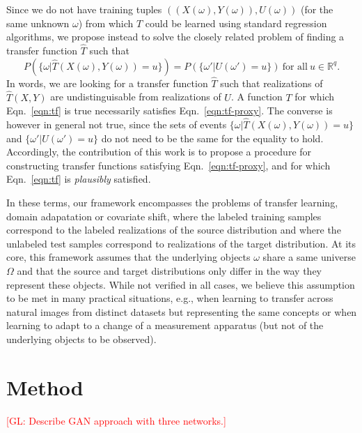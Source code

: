 \documentclass{article}
\newcommand{\glnote}[1]{\textcolor{red}{[GL: #1]}}
\begin{document}
Since we do not have training tuples $((X(\omega), Y(\omega)), U(\omega))$ (for the same
unknown $\omega$) from which $T$ could be learned using standard regression
algorithms, we propose instead to solve the closely related problem of
finding a transfer function $\hat T$ such that
\begin{equation}\label{eqn:tf-proxy}
P(\{ \omega | \hat T(X(\omega), Y(\omega)) = u \}) = P(\{ \omega' | U(\omega') = u \}) ~\text{for all}~ u \in \mathbb{R}^q.
\end{equation}
In words, we are looking for a transfer function $\hat T$ such that realizations
of $\hat T(X,Y)$ are undistinguisable from realizations of $U$. A function $T$ for
which Eqn.~\ref{eqn:tf} is true necessarily satisfies Eqn.~\ref{eqn:tf-proxy}.
The converse is however in general not true, since the sets of events $\{ \omega |
\hat T(X(\omega), Y(\omega)) = u \}$ and $\{ \omega' | U(\omega') = u \}$ do not need to be
the same for the equality to hold. Accordingly, the contribution of this work is
to propose a procedure for constructing transfer functions satisfying
Eqn.~\ref{eqn:tf-proxy}, and for which Eqn.~\ref{eqn:tf} is {\it plausibly}
satisfied.

In these terms, our framework encompasses the problems of transfer learning,
domain adapatation or covariate shift, where the labeled training samples
correspond to the labeled realizations of the source distribution and where the
unlabeled test samples correspond to realizations of the target distribution. At
its core, this framework assumes that the underlying objects $\omega$ share a
same universe $\Omega$ and that the source and target distributions only differ
in the way they represent these objects. While not verified in all cases, we
believe this assumption to be met in many practical situations, e.g., when
learning to transfer across natural images from distinct datasets but
representing the same concepts or when learning to adapt to a change of a
measurement apparatus (but not of the underlying objects to be observed).



\section{Method}

\glnote{Describe GAN approach with three networks.}
\end{document}
